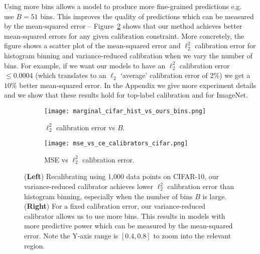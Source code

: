 Using more bins allows a model to produce more fine-grained predictions e.g.~\cite{brocker2012empirical} use $B = 51$ bins. This improves the quality of predictions which can be measured by the mean-squared error -- Figure~\ref{fig:cifar_calibrator_cmp_mse_ce} shows that our method achieves better mean-squared errors for any given calibration constraint. More concretely, the figure shows a scatter plot of the mean-squared error and $\ell_2^2$ calibration error for histogram binning and variance-reduced calibration when we vary the number of bins. For example, if we want our models to have an $\ell_2^2$ calibration error $\leq 0.0004$ (which translates to an $\ell_2$ `average' calibration error of 2\%) we get a $10\%$ better mean-squared error. In the Appendix we give more experiment details and we show that these results hold for top-label calibration and for ImageNet.

\begin{figure}
  \centering
  \centering
     \begin{subfigure}[b]{0.55\textwidth}
         \centering
         \texttt{[image: marginal\_cifar\_hist\_vs\_ours\_bins.png]}
         \caption{$\ell_2^2$ calibration error vs $B$. }
         \label{fig:marginal_calibrator_comparison_cifar}
     \end{subfigure}
     \hfill
     \begin{subfigure}[b]{0.4\textwidth}
         \centering
         \texttt{[image: mse\_vs\_ce\_calibrators\_cifar.png]}
         \caption{MSE vs $\ell_2^2$ calibration error. }
         \label{fig:cifar_calibrator_cmp_mse_ce}
     \end{subfigure}
  \caption{
  (\textbf{Left}) Recalibrating using 1,000 data points on CIFAR-10, our variance-reduced calibrator achieves lower $\ell_2^2$ calibration error than histogram binning, especially when the number of bins $B$ is large.
  (\textbf{Right}) For a fixed calibration error, our variance-reduced calibrator allows us to use more bins. This results in models with more predictive power which can be measured by the mean-squared error. Note the Y-axis range is $[0.4, 0.8]$ to zoom into the relevant region.
  }
  \label{fig:nan2}
\end{figure}



